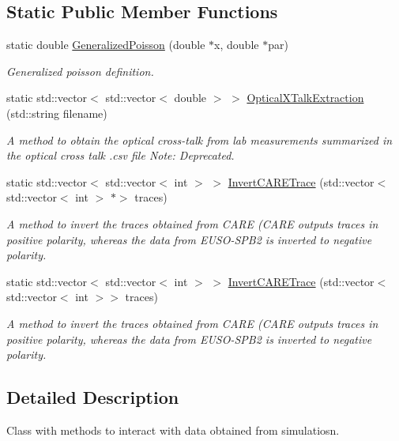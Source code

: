 \subsection*{Static Public Member Functions}
\begin{DoxyCompactItemize}
\item 
static double \hyperlink{classISims_a1d3a8745f63eceae6a418bd749a9f4e3}{Generalized\+Poisson} (double $\ast$x, double $\ast$par)
\begin{DoxyCompactList}\small\item\em Generalized poisson definition. \end{DoxyCompactList}\item 
static std\+::vector$<$ std\+::vector$<$ double $>$ $>$ \hyperlink{classISims_ae19165760194508b928ad218e2341320}{Optical\+X\+Talk\+Extraction} (std\+::string filename)
\begin{DoxyCompactList}\small\item\em A method to obtain the optical cross-\/talk from lab measurements summarized in the optical cross talk .csv file Note\+: Deprecated. \end{DoxyCompactList}\item 
static std\+::vector$<$ std\+::vector$<$ int $>$ $>$ \hyperlink{classISims_a4e7aee18de24c88f2c26be360d3764ed}{Invert\+C\+A\+R\+E\+Trace} (std\+::vector$<$ std\+::vector$<$ int $>$ $\ast$$>$ traces)
\begin{DoxyCompactList}\small\item\em A method to invert the traces obtained from C\+A\+RE (C\+A\+RE outputs traces in positive polarity, whereas the data from E\+U\+S\+O-\/\+S\+P\+B2 is inverted to negative polarity. \end{DoxyCompactList}\item 
static std\+::vector$<$ std\+::vector$<$ int $>$ $>$ \hyperlink{classISims_a50c5cd0b1217885e5b7054f67bc681e1}{Invert\+C\+A\+R\+E\+Trace} (std\+::vector$<$ std\+::vector$<$ int $>$$>$ traces)
\begin{DoxyCompactList}\small\item\em A method to invert the traces obtained from C\+A\+RE (C\+A\+RE outputs traces in positive polarity, whereas the data from E\+U\+S\+O-\/\+S\+P\+B2 is inverted to negative polarity. \end{DoxyCompactList}\end{DoxyCompactItemize}


\subsection{Detailed Description}
Class with methods to interact with data obtained from simulatiosn. 


